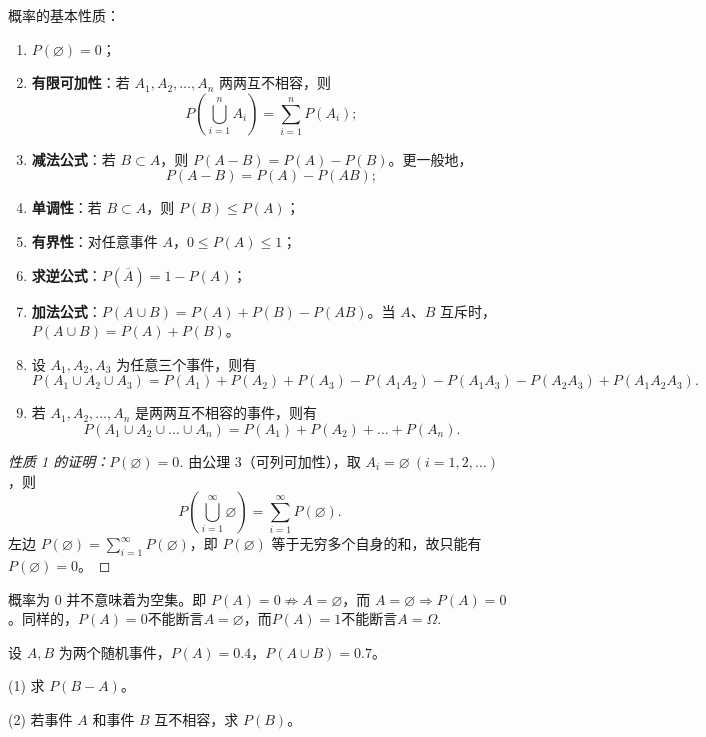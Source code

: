 ﻿\documentclass[lang=cn,11pt]{elegantbook}
\begin{document}
\begin{property}\label{prop:probability-basic}
概率的基本性质：
\begin{enumerate}
    \item \(P(\varnothing) = 0\)；
    \item \textbf{有限可加性}：若 \(A_1, A_2, \dots, A_n\) 两两互不相容，则
    \[
    P\!\left(\bigcup_{i=1}^{n} A_i\right) = \sum_{i=1}^{n} P(A_i);
    \]
    \item \textbf{减法公式}：若 \(B \subset A\)，则 \(P(A - B) = P(A) - P(B)\)。更一般地，
    \[
    P(A - B) = P(A) - P(AB);
    \]
    \item \textbf{单调性}：若 \(B \subset A\)，则 \(P(B) \le P(A)\)；
    \item \textbf{有界性}：对任意事件 \(A\)，\(0 \le P(A) \le 1\)；
    \item \textbf{求逆公式}：\(P(\overline{A}) = 1 - P(A)\)；
    \item \textbf{加法公式}：\(P(A \cup B) = P(A) + P(B) - P(AB)\)。当 \(A\)、\(B\) 互斥时，\(P(A \cup B) = P(A) + P(B)\)。
    \item 设 \(A_1, A_2, A_3\) 为任意三个事件，则有
    \[
    P(A_1 \cup A_2 \cup A_3) = P(A_1) + P(A_2) + P(A_3) - P(A_1A_2) - P(A_1A_3) - P(A_2A_3) + P(A_1A_2A_3).
    \]
    \item 若 \(A_1, A_2, \dots, A_n\) 是两两互不相容的事件，则有
    \[
    P(A_1 \cup A_2 \cup \dots \cup A_n) = P(A_1) + P(A_2) + \dots + P(A_n).
    \]
\end{enumerate}
\end{property}
\begin{proof}[性质 1 的证明：\(P(\varnothing)=0\)]
由公理 3（可列可加性），取 \(A_i = \varnothing\ (i=1,2,\dots)\)，则
\[
P\!\left(\bigcup_{i=1}^{\infty} \varnothing\right) = \sum_{i=1}^{\infty} P(\varnothing).
\]
左边 \(P(\varnothing) = \sum_{i=1}^{\infty} P(\varnothing)\)，即 \(P(\varnothing)\) 等于无穷多个自身的和，故只能有 \(P(\varnothing) = 0\)。
\end{proof}

\begin{note}
概率为 0 并不意味着为空集。即 \(P(A) = 0 \nRightarrow A = \varnothing\)，而 \(A = \varnothing \Rightarrow P(A) = 0\)。同样的，$P(A) = 0$不能断言$A = \varnothing$，而$P(A) = 1$不能断言$A = \Omega$.
\end{note}

\begin{exercise}\label{exer:1-3}
设 \(A, B\) 为两个随机事件，\(P(A) = 0.4\)，\(P(A \cup B) = 0.7\)。\par
(1) 求 \(P(B - A)\)。\par
(2) 若事件 \(A\) 和事件 \(B\) 互不相容，求 \(P(B)\)。
\end{exercise}
\end{document}
